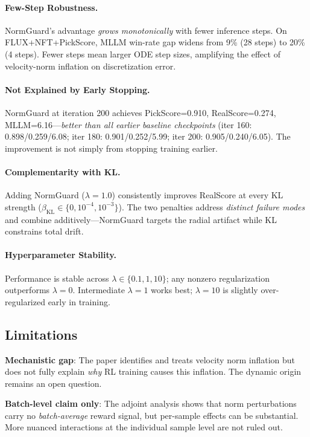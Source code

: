 \documentclass[11pt,a4paper]{article}
\begin{document}
\paragraph{Few-Step Robustness.} NormGuard's advantage \emph{grows monotonically} with fewer inference steps. On FLUX+NFT+PickScore, MLLM win-rate gap widens from 9\% (28 steps) to 20\% (4 steps). Fewer steps mean larger ODE step sizes, amplifying the effect of velocity-norm inflation on discretization error.

\paragraph{Not Explained by Early Stopping.} NormGuard at iteration 200 achieves PickScore=0.910, RealScore=0.274, MLLM=6.16---\emph{better than all earlier baseline checkpoints} (iter 160: 0.898/0.259/6.08; iter 180: 0.901/0.252/5.99; iter 200: 0.905/0.240/6.05). The improvement is not simply from stopping training earlier.

\paragraph{Complementarity with KL.} Adding NormGuard ($\lambda=1.0$) consistently improves RealScore at every KL strength ($\beta_{\mathrm{KL}} \in \{0, 10^{-4}, 10^{-3}\}$). The two penalties address \emph{distinct failure modes} and combine additively---NormGuard targets the radial artifact while KL constrains total drift.

\paragraph{Hyperparameter Stability.} Performance is stable across $\lambda \in \{0.1, 1, 10\}$; any nonzero regularization outperforms $\lambda=0$. Intermediate $\lambda=1$ works best; $\lambda=10$ is slightly over-regularized early in training.

\subsection{Limitations}

\textbf{Mechanistic gap}: The paper identifies and treats velocity norm inflation but does not fully explain \emph{why} RL training causes this inflation. The dynamic origin remains an open question.

\textbf{Batch-level claim only}: The adjoint analysis shows that norm perturbations carry no \emph{batch-average} reward signal, but per-sample effects can be substantial. More nuanced interactions at the individual sample level are not ruled out.
\end{document}
